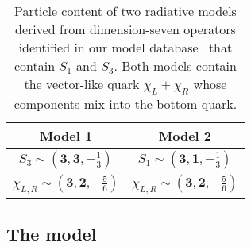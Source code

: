 \begin{table}[t]
  \centering
  \bgroup
  \def\arraystretch{1.3}
  \begin{tabular}{cc}
    \toprule
    Model 1 & Model 2 \\
    \midrule
    $S_{3} \sim (\mathbf{3}, \mathbf{3}, -\tfrac{1}{3})$ & $S_{1} \sim (\mathbf{3}, \mathbf{1}, -\tfrac{1}{3})$\\
    $\chi_{L,R} \sim (\mathbf{3}, \mathbf{2}, -\tfrac{5}{6})$ & $\chi_{L,R} \sim (\mathbf{3}, \mathbf{2}, -\tfrac{5}{6})$\\
    \bottomrule
  \end{tabular}
  \egroup
  \caption[Particle content of two radiative models derived from dimension-seven
    operators identified in our model
    database~\cite{gargalionis_john_2020_4054618} that contain $S_{1}$ and
    $S_{3}$.]{Particle content of two radiative models derived from dimension-seven
    operators identified in our model
    database~\cite{gargalionis_john_2020_4054618} that contain $S_{1}$ and
    $S_{3}$. Both models contain the vector-like quark $\chi_{L} + \chi_{R}$
    whose components mix into the bottom quark.}
  \label{tab:ch4-d7-models}
\end{table}

\subsection{The model}
\label{sec:ch4-innes-model}

